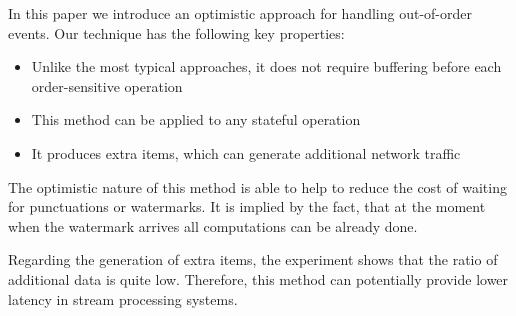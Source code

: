 
\label {fs-conclusion}

In this paper we introduce an optimistic approach for handling out-of-order events. Our technique has the following key properties:

\begin{itemize}
    \item Unlike the most typical approaches, it does not require buffering before each order-sensitive operation
    \item This method can be applied to any stateful operation
    \item It produces extra items, which can generate additional network traffic
\end{itemize}

The optimistic nature of this method is able to help to reduce the cost of waiting for punctuations or watermarks. It is implied by the fact, that at the moment when the watermark arrives all computations can be already done. 

Regarding the generation of extra items, the experiment shows that the ratio of additional data is quite low. Therefore, this method can potentially provide lower latency in stream processing systems.